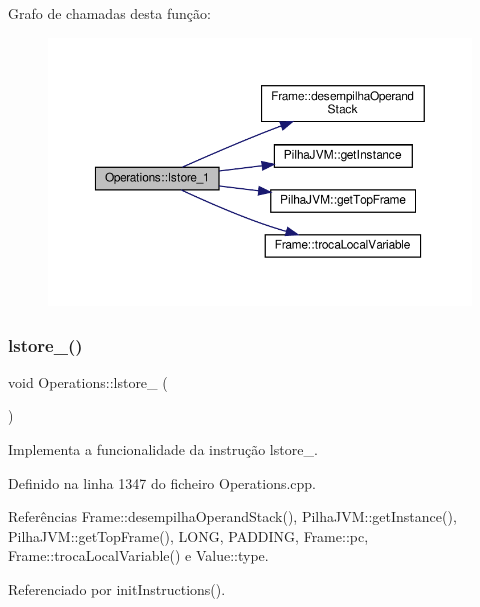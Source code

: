 Grafo de chamadas desta função\+:\nopagebreak
\begin{figure}[H]
\begin{center}
\leavevmode
\includegraphics[width=350pt]{classOperations_aa162cef00367e3d5fb5dca12494a5793_cgraph}
\end{center}
\end{figure}
\mbox{\label{classOperations_a178660c2b3ca2625c140daf867531386}} 
\subsubsection{\texorpdfstring{lstore\+\_()}{lstore\_2()}}
{\footnotesize\ttfamily void Operations\+::lstore\+\_ (\begin{DoxyParamCaption}{ }\end{DoxyParamCaption})\hspace{0.3cm}{\ttfamily [private]}}



Implementa a funcionalidade da instrução lstore\+\_. 



Definido na linha 1347 do ficheiro Operations.\+cpp.



Referências Frame\+::desempilha\+Operand\+Stack(), Pilha\+J\+V\+M\+::get\+Instance(), Pilha\+J\+V\+M\+::get\+Top\+Frame(), L\+O\+NG, P\+A\+D\+D\+I\+NG, Frame\+::pc, Frame\+::troca\+Local\+Variable() e Value\+::type.



Referenciado por init\+Instructions().

